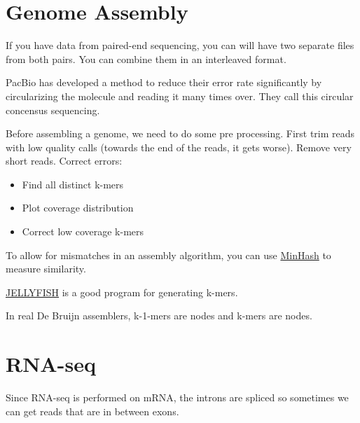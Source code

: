 \documentclass{article}
\begin{document}
\section{Genome Assembly}

If you have data from paired-end sequencing, you can will have two separate files from both pairs. You can combine them in an interleaved format.

PacBio has developed a method to reduce their error rate significantly by circularizing the molecule and reading it many times over. They call this circular concensus sequencing.

Before assembling a genome, we need to do some pre processing. First trim reads with low quality calls (towards the end of the reads, it gets worse). Remove very short reads. Correct errors:
\begin{itemize}
    \item Find all distinct k-mers
    \item Plot coverage distribution
    \item Correct low coverage k-mers
\end{itemize}

To allow for mismatches in an assembly algorithm, you can use \href{https://en.wikipedia.org/wiki/MinHash}{MinHash} to measure similarity.

\href{https://www.cbcb.umd.edu/software/jellyfish/}{JELLYFISH} is a good program for generating k-mers.

In real De Bruijn assemblers, k-1-mers are nodes and k-mers are nodes.

\section{RNA-seq}

Since RNA-seq is performed on mRNA, the introns are spliced so sometimes we can get reads that are in between exons.
\end{document}
